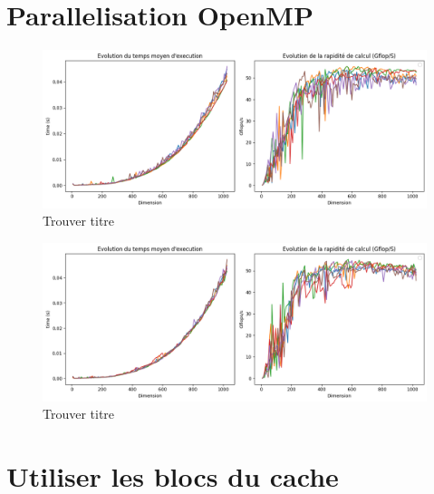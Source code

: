 \documentclass{report}
\begin{document}
\chapter{Parallelisation OpenMP}

\begin{figure}[H]
    \centering
    \includegraphics[width=0.7\linewidth]{images/fig4.png}
    \caption{Trouver titre}
    \label{fig:4}
\end{figure}

\begin{figure}[H]
    \centering
    \includegraphics[width=0.7\linewidth]{images/fig5.png}
    \caption{Trouver titre}
    \label{fig:5}
\end{figure}

\chapter{Utiliser les blocs du cache}



\end{document}
